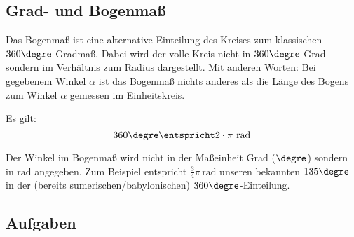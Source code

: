 
\subsection{Grad- und Bogenmaß}

Das Bogenmaß ist eine alternative Einteilung des Kreises zum
klassischen $360\degre$-Gradmaß. Dabei wird der volle Kreis nicht in
$360\degre$ Grad sondern im Verhältnis zum Radius dargestellt. Mit
anderen Worten: Bei gegebenem Winkel $\alpha$ ist das Bogenmaß nichts
anderes als die Länge des Bogens zum Winkel $\alpha$ gemessen im Einheitskreis.


Es gilt:
$$360\degre \entspricht 2\cdot\pi \textrm{\,\,rad}$$

Der Winkel im Bogenmaß wird nicht in der Maßeinheit Grad (${}\degre$)
sondern in $\textrm{rad}$ angegeben. Zum Beispiel entspricht
$\frac{3}{4}\pi\,\textrm{rad}$ unseren bekannten $135\degre$ in der
(bereits sumerischen/babylonischen) $360\degre$-Einteilung.

\subsection*{Aufgaben}
